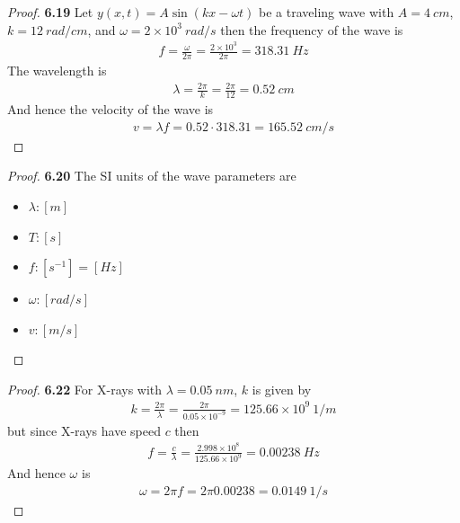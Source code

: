 \documentclass[11pt]{article}
\theoremstyle{definition}
\begin{document}
\begin{proof}{\textbf{6.19}}
    Let $y(x,t) = A \sin(kx - \omega t)$ be a traveling wave with $A = 4~cm$,
    $k = 12~rad/cm$, and $\omega = 2 \times 10^3~rad/s$ then the frequency
    of the wave is
    \begin{align*}
        f = \frac{\omega}{2\pi} = \frac{2 \times 10^3}{2\pi} = 318.31~Hz
    \end{align*}
    The wavelength is
    \begin{align*}
        \lambda = \frac{2\pi}{k} = \frac{2\pi}{12} = 0.52~cm
    \end{align*}
    And hence the velocity of the wave is
    \begin{align*}
        v = \lambda f = 0.52 \cdot 318.31 = 165.52~cm/s
    \end{align*}
\end{proof}
\begin{proof}{\textbf{6.20}}
    The SI units of the wave parameters are
    \begin{itemize}
        \item [] $\lambda: [m]$
        \item [] $T: [s]$
        \item [] $f: [s^{-1}] = [Hz]$
        \item [] $\omega: [rad/s]$
        \item [] $v: [m/s]$
    \end{itemize}
\end{proof}
\begin{proof}{\textbf{6.22}}
    For X-rays with $\lambda= 0.05~nm$, $k$ is given by
    \begin{align*}
        k = \frac{2\pi}{\lambda} = \frac{2\pi}{0.05 \times 10^{-9}} = 125.66\times 10^9~1/m
    \end{align*}
    but since X-rays have speed $c$ then
    \begin{align*}
        f = \frac{c}{\lambda} = \frac{2.998\times 10^8}{125.66\times 10^9}
        = 0.00238~Hz
    \end{align*}
    And hence $\omega$ is
    \begin{align*}
        \omega = 2 \pi f = 2 \pi 0.00238 = 0.0149~1/s
    \end{align*}
\end{proof}
\end{document}

